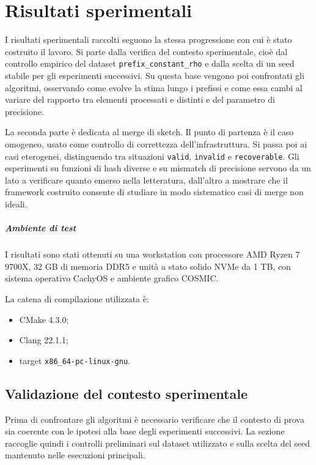 \chapter{Risultati sperimentali}
\label{chp:risultati_nuovo}

I risultati sperimentali raccolti seguono la stessa progressione con cui è
stato costruito il lavoro. Si parte dalla verifica del
contesto sperimentale, cioè dal controllo empirico del dataset
\texttt{prefix\_constant\_rho} e dalla scelta di un seed stabile per gli
esperimenti successivi. Su questa base vengono poi confrontati gli algoritmi, 
osservando come evolve la stima lungo i prefissi e come
essa cambi al variare del rapporto tra elementi processati e distinti e del
parametro di precisione.

La seconda parte è dedicata al merge di sketch. Il punto di partenza è il caso
omogeneo, usato come controllo di correttezza dell'infrastruttura. Si passa poi
ai casi eterogenei, distinguendo tra situazioni \texttt{valid},
\texttt{invalid} e \texttt{recoverable}. Gli esperimenti su funzioni di hash
diverse e su mismatch di precisione servono da un lato a verificare quanto
emerso nella letteratura, dall'altro a mostrare che il framework costruito
consente di studiare in modo sistematico casi di merge non ideali.

\paragraph{Ambiente di test}
I risultati sono stati ottenuti su una workstation con processore AMD Ryzen 7
9700X, 32 GB di memoria DDR5 e unità a stato solido NVMe da 1 TB, con sistema
operativo CachyOS e ambiente grafico COSMIC.

La catena di compilazione utilizzata è:
\begin{itemize}[noitemsep]
    \item CMake 4.3.0;
    \item Clang 22.1.1;
    \item target \texttt{x86\_64-pc-linux-gnu}.
\end{itemize}

\section{Validazione del contesto sperimentale}

Prima di confrontare gli algoritmi è necessario verificare che il contesto di
prova sia coerente con le ipotesi alla base degli esperimenti successivi. La
sezione raccoglie quindi i controlli preliminari sul dataset utilizzato e sulla
scelta del seed mantenuto nelle esecuzioni principali.

